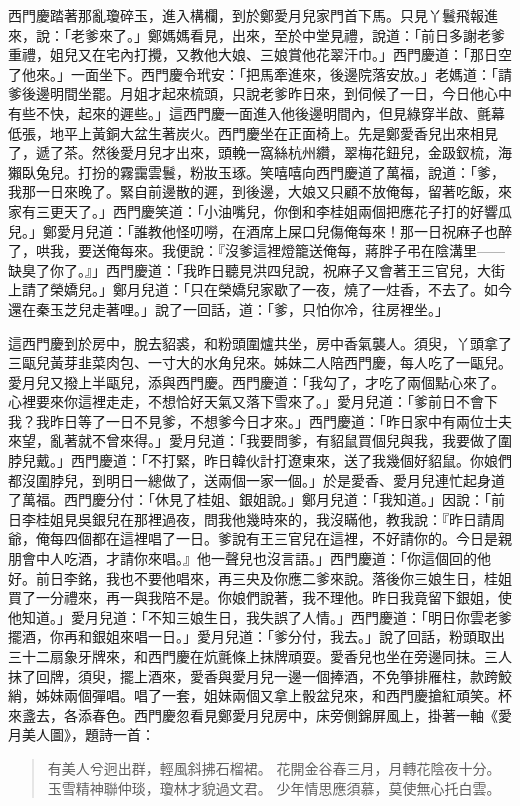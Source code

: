 西門慶踏著那亂瓊碎玉，進入構欄，到於鄭愛月兒家門首下馬。只見丫鬟飛報進來，說：「老爹來了。」鄭媽媽看見，出來，至於中堂見禮，說道：「前日多謝老爹重禮，姐兒又在宅內打攪，又教他大娘、三娘賞他花翠汗巾。」西門慶道：「那日空了他來。」一面坐下。西門慶令玳安：「把馬牽進來，後邊院落安放。」老媽道：「請爹後邊明間坐罷。月姐才起來梳頭，只說老爹昨日來，到伺候了一日，今日他心中有些不快，起來的遲些。」這西門慶一面進入他後邊明間內，但見綠穿半啟、氈幕低張，地平上黃銅大盆生著炭火。西門慶坐在正面椅上。先是鄭愛香兒出來相見了，遞了茶。然後愛月兒才出來，頭輓一窩絲杭州纘，翠梅花鈕兒，金趿釵梳，海獺臥兔兒。打扮的霧靄雲鬟，粉妝玉琢。笑嘻嘻向西門慶道了萬福，說道：「爹，我那一日來晚了。緊自前邊散的遲，到後邊，大娘又只顧不放俺每，留著吃飯，來家有三更天了。」西門慶笑道：「小油嘴兒，你倒和李桂姐兩個把應花子打的好響瓜兒。」鄭愛月兒道：「誰教他怪叨嘮，在酒席上屎口兒傷俺每來！那一日祝麻子也醉了，哄我，要送俺每來。我便說：『沒爹這裡燈籠送俺每，蔣胖子弔在陰溝里——缺臭了你了。』」西門慶道：「我昨日聽見洪四兒說，祝麻子又會著王三官兒，大街上請了榮嬌兒。」鄭月兒道：「只在榮嬌兒家歇了一夜，燒了一炷香，不去了。如今還在秦玉芝兒走著哩。」說了一回話，道：「爹，只怕你冷，往房裡坐。」

這西門慶到於房中，脫去貂裘，和粉頭圍爐共坐，房中香氣襲人。須臾，丫頭拿了三甌兒黃芽韭菜肉包、一寸大的水角兒來。姊妹二人陪西門慶，每人吃了一甌兒。愛月兒又撥上半甌兒，添與西門慶。西門慶道：「我勾了，才吃了兩個點心來了。心裡要來你這裡走走，不想恰好天氣又落下雪來了。」愛月兒道：「爹前日不會下我？我昨日等了一日不見爹，不想爹今日才來。」西門慶道：「昨日家中有兩位士夫來望，亂著就不曾來得。」愛月兒道：「我要問爹，有貂鼠買個兒與我，我要做了圍脖兒戴。」西門慶道：「不打緊，昨日韓伙計打遼東來，送了我幾個好貂鼠。你娘們都沒圍脖兒，到明日一總做了，送兩個一家一個。」於是愛香、愛月兒連忙起身道了萬福。西門慶分付：「休見了桂姐、銀姐說。」鄭月兒道：「我知道。」因說：「前日李桂姐見吳銀兒在那裡過夜，問我他幾時來的，我沒瞞他，教我說：『昨日請周爺，俺每四個都在這裡唱了一日。爹說有王三官兒在這裡，不好請你的。今日是親朋會中人吃酒，才請你來唱。』他一聲兒也沒言語。」西門慶道：「你這個回的他好。前日李銘，我也不要他唱來，再三央及你應二爹來說。落後你三娘生日，桂姐買了一分禮來，再一與我陪不是。你娘們說著，我不理他。昨日我竟留下銀姐，使他知道。」愛月兒道：「不知三娘生日，我失誤了人情。」西門慶道：「明日你雲老爹擺酒，你再和銀姐來唱一日。」愛月兒道：「爹分付，我去。」說了回話，粉頭取出三十二扇象牙牌來，和西門慶在炕氈條上抹牌頑耍。愛香兒也坐在旁邊同抹。三人抹了回牌，須臾，擺上酒來，愛香與愛月兒一邊一個捧酒，不免箏排雁柱，款跨鮫綃，姊妹兩個彈唱。唱了一套，姐妹兩個又拿上骰盆兒來，和西門慶搶紅頑笑。杯來盞去，各添春色。西門慶忽看見鄭愛月兒房中，床旁側錦屏風上，掛著一軸《愛月美人圖》，題詩一首：
\begin{quote}
有美人兮迥出群，輕風斜拂石榴裙。
花開金谷春三月，月轉花陰夜十分。
玉雪精神聯仲琰，瓊林才貌過文君。
少年情思應須慕，莫使無心托白雲。
\end{quote}

